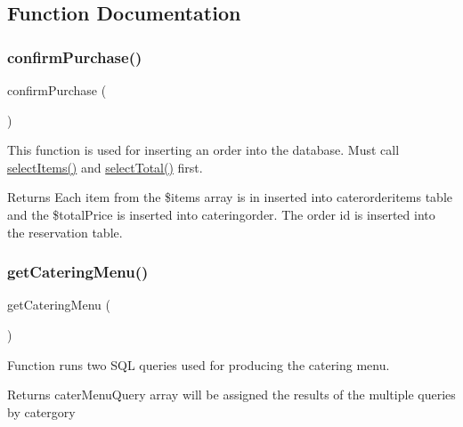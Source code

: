 \subsection{Function Documentation}
\mbox{\label{_catering___order___selection_8class_8php_a539ea0c001b23b8d52ffadcec3bc3174}} 
\subsubsection{\texorpdfstring{confirmPurchase()}{confirmPurchase()}}
{\footnotesize\ttfamily confirm\+Purchase (\begin{DoxyParamCaption}{ }\end{DoxyParamCaption})}

This function is used for inserting an order into the database. Must call \mbox{\hyperlink{_catering___order___selection_8class_8php_ab30920ac61f282a414092277587a25a1}{select\+Items()}} and \mbox{\hyperlink{_catering___order___selection_8class_8php_a8479e007f854c94229714a8425c5b6c0}{select\+Total()}} first. \begin{DoxyReturn}{Returns}
Each item from the \$items array is in inserted into caterorderitems table and the \$total\+Price is inserted into cateringorder. The order id is inserted into the reservation table. 
\end{DoxyReturn}
\mbox{\label{_catering___order___selection_8class_8php_a556c7043d3b316ccab6e46f531abec7f}} 
\subsubsection{\texorpdfstring{getCateringMenu()}{getCateringMenu()}}
{\footnotesize\ttfamily get\+Catering\+Menu (\begin{DoxyParamCaption}{ }\end{DoxyParamCaption})}

Function runs two S\+QL queries used for producing the catering menu. \begin{DoxyReturn}{Returns}
cater\+Menu\+Query array will be assigned the results of the multiple queries by catergory 
\end{DoxyReturn}
\mbox{\label{_catering___order___selection_8class_8php_afea91457e1886d995f1a6de7439ceaeb}} 
